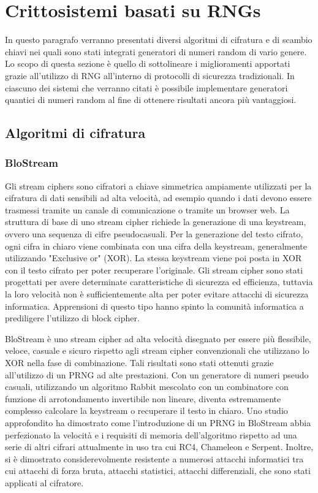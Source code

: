\section{Crittosistemi basati su RNGs}
\label{subsec-crittosistemiRNG}
In questo paragrafo verranno presentati diversi algoritmi di cifratura e di scambio chiavi nei quali sono stati integrati generatori di numeri random di vario genere. Lo scopo di questa sezione è quello di sottolineare i miglioramenti apportati grazie all'utilizzo di RNG all'interno di protocolli di sicurezza tradizionali. In ciascuno dei sistemi che verranno citati è possibile implementare generatori quantici di numeri random al fine di ottenere risultati ancora più vantaggiosi. 

\subsection{Algoritmi di cifratura}

\subsubsection{BloStream} 
Gli stream ciphers sono cifratori a chiave simmetrica ampiamente utilizzati per la cifratura di dati sensibili ad alta velocità, ad esempio quando i dati devono essere trasmessi tramite un canale di comunicazione o tramite un browser web. La struttura di base di uno stream cipher richiede la generazione di una keystream, ovvero una sequenza di cifre pseudocasuali. Per la generazione del testo cifrato, ogni cifra in chiaro viene combinata con una cifra della keystream, generalmente utilizzando "Exclusive or" (XOR). La stessa keystream viene poi posta in XOR con il testo cifrato per poter recuperare l'originale.   Gli stream cipher sono stati progettati per avere determinate caratteristiche di sicurezza ed efficienza, tuttavia la loro velocità non è sufficientemente alta per poter evitare attacchi di sicurezza informatica. Apprensioni di questo tipo hanno spinto la comunità informatica a prediligere l'utilizzo di block cipher. 

BloStream \cite{kashmar_blostream_2017} è uno stream cipher ad alta velocità disegnato per essere più flessibile, veloce, casuale e sicuro rispetto agli stream cipher convenzionali che utilizzano lo XOR nella fase di combinazione. Tali risultati sono stati ottenuti grazie all'utilizzo di un PRNG ad alte prestazioni. Con un generatore di numeri pseudo casuali, utilizzando un algoritmo Rabbit mescolato con un combinatore con funzione di arrotondamento invertibile non lineare, diventa estremamente complesso calcolare la keystream o recuperare il testo in chiaro. Uno studio approfondito \cite{kashmar_blostream_2017} ha dimostrato come l'introduzione di un PRNG in BloStream abbia perfezionato la velocità e i requisiti di memoria dell'algoritmo rispetto ad una serie di altri cifrari attualmente in uso tra cui RC4, Chameleon e Serpent. Inoltre, si è dimostrato considerevolmente resistente a numerosi attacchi informatici tra cui attacchi di forza bruta, attacchi statistici, attacchi differenziali, che sono stati applicati al cifratore.  

